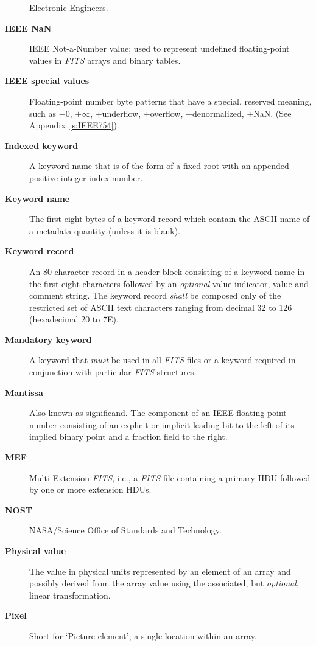 \documentclass[onecolumn]{aa}
\begin{document}
\begin{description}
        Electronic Engineers.
\item[\bf IEEE NaN] IEEE Not-a-Number 
        value; used to represent undefined floating-point values
	in {\em FITS\/} arrays and binary tables.
\item[\bf IEEE special values] Floating-point number byte patterns that have
       a special, reserved meaning, such as
        $-0$, $\pm \infty$, $\pm$underflow, $\pm$overflow, $\pm$denormalized,
        $\pm$NaN. (See Appendix~\ref{s:IEEE754}).
\item[\bf Indexed keyword] A keyword name that is 
       of the form of a fixed root with an appended positive integer index number.
\item[\bf Keyword name] The first eight bytes of a keyword record which
contain the ASCII name of a metadata quantity (unless it is blank).
\item[\bf Keyword record] An 80-character record in a header block
consisting of a keyword name in the first eight characters followed by an {\em optional}
value indicator, value and comment string.  
The keyword record {\em shall} be composed only of the
restricted set of ASCII text characters ranging from decimal 32 to 126 
(hexadecimal 20 to 7E).
\item[\bf Mandatory keyword] A keyword that {\em must} 
   be used in all {\em FITS\/} files or a keyword required 
   in conjunction with particular {\em FITS\/}
   structures.
\item[\bf Mantissa] Also known as
                significand. The component of an IEEE floating-point
                number consisting of an explicit or implicit leading bit
                to the left of its implied binary point and a fraction
                field to the right.          
\item[\bf MEF] Multi-Extension {\em FITS\/}, i.e., a {\em FITS} file containing a primary
    HDU followed by one or more extension HDUs.
\item[\bf NOST] NASA/Science Office of Standards and 
       Technology.
\item[\bf Physical value] The value in physical 
   units represented by an element
   of an array and possibly derived from 
   the array value
   using the associated, but {\em optional}, linear transformation.
\item[\bf Pixel] Short for `Picture element';  a single location within an array.

\end{description}
\end{document}
